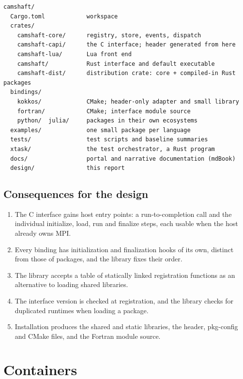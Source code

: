 \documentclass[11pt,a4paper]{article}
\begin{document}
\begin{lstlisting}
camshaft/
  Cargo.toml            workspace
  crates/
    camshaft-core/      registry, store, events, dispatch
    camshaft-capi/      the C interface; header generated from here
    camshaft-lua/       Lua front end
    camshaft/           Rust interface and default executable
    camshaft-dist/      distribution crate: core + compiled-in Rust packages
  bindings/
    kokkos/             CMake; header-only adapter and small library
    fortran/            CMake; interface module source
    python/  julia/     packages in their own ecosystems
  examples/             one small package per language
  tests/                test scripts and baseline summaries
  xtask/                the test orchestrator, a Rust program
  docs/                 portal and narrative documentation (mdBook)
  design/               this report
\end{lstlisting}

\subsection{Consequences for the design}

\begin{enumerate}
  \item The C interface gains host entry points: a run-to-completion call
        and the individual initialize, load, run and finalize steps, each
        usable when the host already owns MPI.
  \item Every binding has initialization and finalization hooks of its own,
        distinct from those of packages, and the library fixes their order.
  \item The library accepts a table of statically linked registration
        functions as an alternative to loading shared libraries.
  \item The interface version is checked at registration, and the library
        checks for duplicated runtimes when loading a package.
  \item Installation produces the shared and static libraries, the header,
        pkg-config and CMake files, and the Fortran module source.
\end{enumerate}

\section{Containers}
\label{sec:containers}
\end{document}
